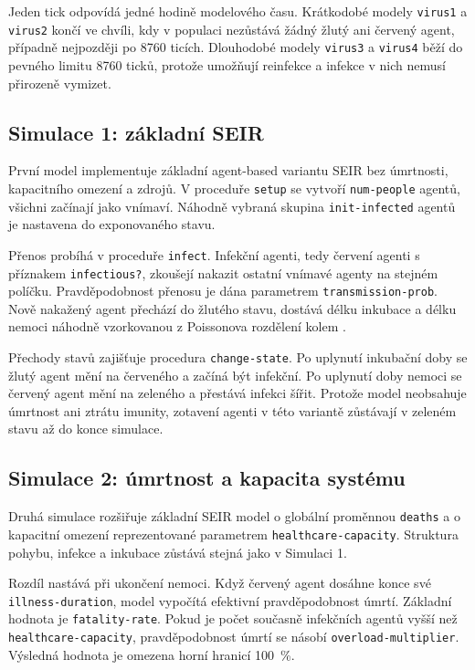 \documentclass{article}
\begin{document}
Jeden tick odpovídá jedné hodině modelového času. Krátkodobé modely
\texttt{virus1} a \texttt{virus2} končí ve chvíli, kdy v populaci nezůstává žádný
žlutý ani červený agent, případně nejpozději po 8760 ticích. Dlouhodobé modely
\texttt{virus3} a \texttt{virus4} běží do pevného limitu 8760 ticků, protože
umožňují reinfekce a infekce v nich nemusí přirozeně vymizet.

\subsection{Simulace 1: základní SEIR}

První model implementuje základní agent-based variantu SEIR bez úmrtnosti,
kapacitního omezení a zdrojů. V proceduře \texttt{setup} se vytvoří
\texttt{num-people} agentů, všichni začínají jako vnímaví. Náhodně vybraná
skupina \texttt{init-infected} agentů je nastavena do exponovaného stavu.

Přenos probíhá v proceduře \texttt{infect}. Infekční agenti, tedy červení agenti
s příznakem \texttt{infectious?}, zkoušejí nakazit ostatní vnímavé agenty na
stejném políčku. Pravděpodobnost přenosu je dána parametrem
\texttt{transmission-prob}. Nově nakažený agent přechází do žlutého stavu,
dostává délku inkubace  a délku nemoci náhodně
vzorkovanou z Poissonova rozdělení kolem .

Přechody stavů zajišťuje procedura \texttt{change-state}. Po uplynutí
inkubační doby se žlutý agent mění na červeného a začíná být infekční. Po
uplynutí doby nemoci se červený agent mění na zeleného a přestává infekci šířit.
Protože model neobsahuje úmrtnost ani ztrátu imunity, zotavení agenti v této
variantě zůstávají v zeleném stavu až do konce simulace.

\subsection{Simulace 2: úmrtnost a kapacita systému}

Druhá simulace rozšiřuje základní SEIR model o globální proměnnou
\texttt{deaths} a o kapacitní omezení reprezentované parametrem
\texttt{healthcare-capacity}. Struktura pohybu, infekce a inkubace zůstává
stejná jako v Simulaci 1.

Rozdíl nastává při ukončení nemoci. Když červený agent dosáhne konce své
\texttt{illness-duration}, model vypočítá efektivní pravděpodobnost úmrtí.
Základní hodnota je \texttt{fatality-rate}. Pokud je počet současně infekčních
agentů vyšší než \texttt{healthcare-capacity}, pravděpodobnost úmrtí se násobí
\texttt{overload-multiplier}. Výsledná hodnota je omezena horní hranicí
100~\%.
\end{document}

